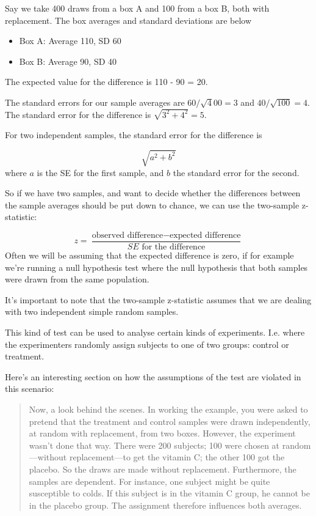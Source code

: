\documentclass[
]{book}
\providecommand{\tightlist}{%
  \setlength{\itemsep}{0pt}\setlength{\parskip}{0pt}}
\begin{document}
Say we take 400 draws from a box A and 100 from a box B, both with replacement. The box averages and standard deviations are below

\begin{itemize}
\tightlist
\item
  Box A: Average 110, SD 60
\item
  Box B: Average 90, SD 40
\end{itemize}

The expected value for the difference is 110 - 90 = 20.

The standard errors for our sample averages are \(60 / \sqrt400 = 3\) and \(40 / \sqrt{100} = 4\). The standard error for the difference is \(\sqrt{3^2 +4^2}=5\).

For two independent samples, the standard error for the difference is

\[
\sqrt{a^2 + b^2}
\]
where \(a\) is the SE for the first sample, and \(b\) the standard error for the second.

So if we have two samples, and want to decide whether the differences between the sample averages should be put down to chance, we can use the two-sample z-statistic:

\[
z = \frac{\text{observed difference} - \text{expected difference}}{SE \text{ for the difference}}
\]
Often we will be assuming that the expected difference is zero, if for example we're running a null hypothesis test where the null hypothesis that both samples were drawn from the same population.

It's important to note that the two-sample z-statistic assumes that we are dealing with two independent simple random samples.

This kind of test can be used to analyse certain kinds of experiments. I.e. where the experimenters randomly assign subjects to one of two groups: control or treatment.

Here's an interesting section on how the assumptions of the test are violated in this scenario:

\begin{quote}
Now, a look behind the scenes. In working the example, you were asked to pretend that the treatment and control samples were drawn independently, at random with replacement, from two boxes. However, the experiment wasn't done that way. There were 200 subjects; 100 were chosen at random---without replacement---to get the vitamin C; the other 100 got the placebo. So the draws are made without replacement. Furthermore, the samples are dependent. For instance, one subject might be quite susceptible to colds. If this subject is in the vitamin C group, he cannot be in the placebo group. The assignment therefore influences both averages.
\end{quote}
\end{document}
